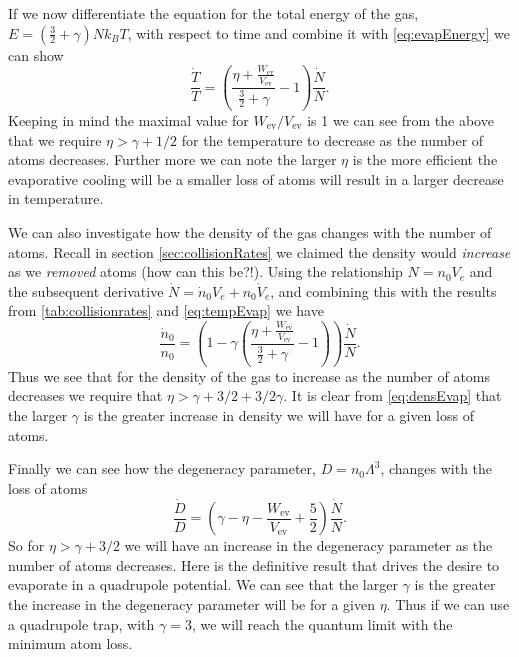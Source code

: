 If we now differentiate the equation for the total energy of the gas, $E=\left(\frac{3}{2} + \gamma\right)Nk_BT$, with respect to time and combine it with \autoref{eq:evapEnergy} we can show
\begin{equation}
    \frac{\dot{T}}{T} = \left(\frac{\eta + \frac{W_\mathrm{ev}}{V_\mathrm{ev}}}{\frac{3}{2}+\gamma}-1\right) \frac{\dot{N}}{N}. \label{eq:tempEvap}
\end{equation}
Keeping in mind the maximal value for $W_\mathrm{ev} / V_\mathrm{ev}$ is 1 we can see from the above that we require $\eta > \gamma + 1/2$ for the temperature to decrease as the number of atoms decreases. 
Further more we can note the larger $\eta$ is the more efficient the evaporative cooling will be \ie a smaller loss of atoms will result in a larger decrease in temperature.

We can also investigate how the density of the gas changes with the number of atoms.
Recall in section \autoref{sec:collisionRates} we claimed the density would \emph{increase} as we \emph{removed} atoms (how can this be?!).
Using the relationship $N=n_0V_e$ and the subsequent derivative $\dot{N} = \dot{n}_0V_e + n_0\dot{V}_e$, and combining this with the results from \autoref{tab:collisionrates} and \autoref{eq:tempEvap} we have
\begin{equation}
    \frac{\dot{n}_0}{n_0} = \left(1-\gamma\left(\frac{\eta + \frac{W_\mathrm{ev}}{V_\mathrm{ev}}}{\frac{3}{2}+\gamma}-1\right)\right) \frac{\dot{N}}{N}. \label{eq:densEvap}
\end{equation}
Thus we see that for the density of the gas to increase as the number of atoms decreases we require that $\eta > \gamma + 3/2 + 3/2\gamma$. 
It is clear from \autoref{eq:densEvap} that the larger $\gamma$ is the greater increase in density we will have for a given loss of atoms.

Finally we can see how the degeneracy parameter, $D=n_0\Lambda^3$, changes with the loss of atoms
\begin{equation}
    \frac{\dot{D}}{D} = \left(\gamma -\eta -\frac{W_\mathrm{ev}}{V_\mathrm{ev}} +\frac{5}{2}\right) \frac{\dot{N}}{N}.
\end{equation}
So for $\eta > \gamma + 3/2$ we will have an increase in the degeneracy parameter as the number of atoms decreases.
Here is the definitive result that drives the desire to evaporate in a quadrupole potential.
We can see that the larger $\gamma$ is the greater the increase in the degeneracy parameter will be for a given $\eta$.
Thus if we can use a quadrupole trap, with $\gamma = 3$, we will reach the quantum limit with the minimum atom loss.

